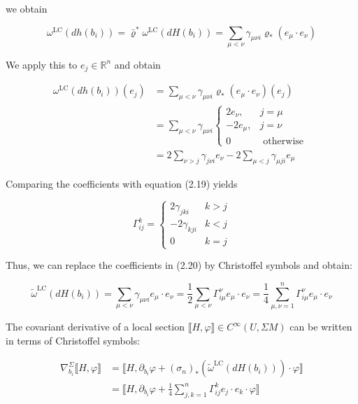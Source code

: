\documentclass[10pt, letterpaper]{article}
\begin{document}
we obtain

$$
\omega^{\mathrm{LC}}\left(d h\left(b_{i}\right)\right)=\bar{\varrho}^{*} \omega^{\mathrm{LC}}\left(d H\left(b_{i}\right)\right)=\sum_{\mu<\nu} \gamma_{\mu \nu i} \varrho_{*}\left(e_{\mu} \cdot e_{\nu}\right)
$$

We apply this to $e_{j} \in \mathbb{R}^{n}$ and obtain

$$
\begin{aligned}
\omega^{\mathrm{LC}}\left(d h\left(b_{i}\right)\right)\left(e_{j}\right) & =\sum_{\mu<\nu} \gamma_{\mu \nu i} \varrho_{*}\left(e_{\mu} \cdot e_{\nu}\right)\left(e_{j}\right) \\
& =\sum_{\mu<\nu} \gamma_{\mu \nu i} \begin{cases}2 e_{\nu}, & j=\mu \\
-2 e_{\mu}, & j=\nu \\
0 & \text { otherwise }\end{cases} \\
& =2 \sum_{\nu>j} \gamma_{j \nu i} e_{\nu}-2 \sum_{\mu<j} \gamma_{\mu j i} e_{\mu}
\end{aligned}
$$

Comparing the coefficients with equation (2.19) yields

$$
\Gamma_{i j}^{k}= \begin{cases}2 \gamma_{j k i} & k>j \\ -2 \gamma_{k j i} & k<j \\ 0 & k=j\end{cases}
$$

Thus, we can replace the coefficients in (2.20) by Christoffel symbols and obtain:

$$
\widetilde{\omega}^{\mathrm{LC}}\left(d H\left(b_{i}\right)\right)=\sum_{\mu<\nu} \gamma_{\mu \nu i} e_{\mu} \cdot e_{\nu}=\frac{1}{2} \sum_{\mu<\nu} \Gamma_{i \mu}^{\nu} e_{\mu} \cdot e_{\nu}=\frac{1}{4} \sum_{\mu, \nu=1}^{n} \Gamma_{i \mu}^{\nu} e_{\mu} \cdot e_{\nu}
$$

The covariant derivative of a local section $\llbracket H, \varphi \rrbracket \in C^{\infty}(U, \Sigma M)$ can be written in terms of Christoffel symbols:

$$
\begin{aligned}
\nabla_{b_{i}}^{\Sigma} \llbracket H, \varphi \rrbracket & =\llbracket H, \partial_{b_{i}} \varphi+\left(\sigma_{n}\right)_{*}\left(\widetilde{\omega}^{\mathrm{LC}}\left(d H\left(b_{i}\right)\right)\right) \cdot \varphi \rrbracket \\
& =\llbracket H, \partial_{b_{i}} \varphi+\frac{1}{4} \sum_{j, k=1}^{n} \Gamma_{i j}^{k} e_{j} \cdot e_{k} \cdot \varphi \rrbracket
\end{aligned}
$$
\end{document}
